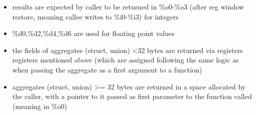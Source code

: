 \begin{itemize}
\item results are expected by caller to be returned in \%o0-\%o3 (after reg window restore, meaning callee writes to \%i0-\%i3) for integers
\item \%d0,\%d2,\%d4,\%d6 are used for floating point values
\item the fields of aggregates (struct, union) \textless 32 bytes are returned via registers registers mentioned above (which are
assigned following the same logic as when passing the aggregate as a first argument to a function)
\item aggregates (struct, union) \textgreater= 32 bytes are returned in a space allocated by the caller, with a pointer to it
passed as first parameter to the function called (meaning in \%o0)
%
%
\end{itemize}

